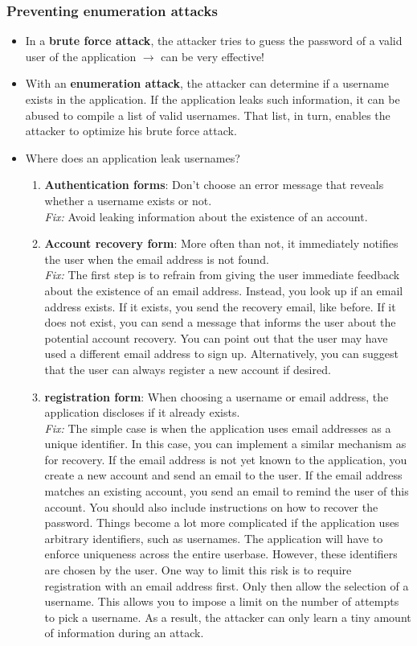 \documentclass[../main.tex]{subfiles}
\begin{document}
\subsubsection{Preventing enumeration attacks}
\begin{itemize}
\item In a \textbf{brute force attack}, the attacker tries to guess the password of a valid user of the application $\rightarrow$ can be very effective!
\item With an \textbf{enumeration attack}, the attacker can determine if a username exists in the application. If the application leaks such information, it can be abused to compile a list of valid usernames. That list, in turn, enables the attacker to optimize his brute force attack.
\item Where does an application leak usernames?
\begin{enumerate}
\item \textbf{Authentication forms}: Don't choose an error message that reveals whether a username exists or not.\\
\emph{Fix:} Avoid leaking information about the existence of an account.
\item \textbf{Account recovery form}: More often than not, it immediately notifies the user when the email address is not found.\\
\emph{Fix:} The first step is to refrain from giving the user immediate feedback about the existence of an email address. Instead, you look up if an email address exists. If it exists, you send the recovery email, like before. If it does not exist, you can send a message that informs the user about the potential account recovery. You can point out that the user may have used a different email address to sign up. Alternatively, you can suggest that the user can always register a new account if desired.
\item \textbf{registration form}: When choosing a username or email address, the application discloses if it already exists.\\
\emph{Fix:} The simple case is when the application uses email addresses as a unique identifier. In this case, you can implement a similar mechanism as for recovery. If the email address is not yet known to the application, you create a new account and send an email to the user. If the email address matches an existing account, you send an email to remind the user of this account. You should also include instructions on how to recover the password. Things become a lot more complicated if the application uses arbitrary identifiers, such as usernames. The application will have to enforce uniqueness across the entire userbase. However, these identifiers are chosen by the user. One way to limit this risk is to require registration with an email address first. Only then allow the selection of a username. This allows you to impose a limit on the number of attempts to pick a username. As a result, the attacker can only learn a tiny amount of information during an attack.

\end{enumerate}
\end{itemize}
\end{document}
